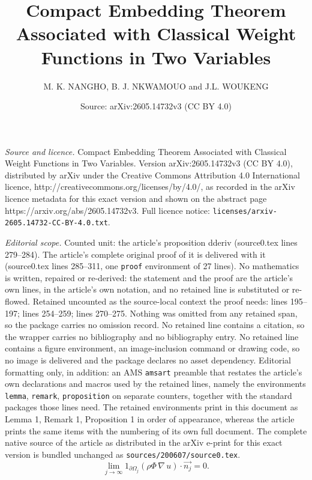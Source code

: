 \documentclass[10pt,a4paper]{amsart}
\title{Compact Embedding Theorem Associated with Classical Weight Functions in Two Variables}
\author{M. K. NANGHO, B. J. NKWAMOUO and J.L. WOUKENG}
\date{Source: arXiv:2605.14732v3 (CC BY 4.0)}
\begin{document}
\maketitle

\noindent\emph{Source and licence.} Compact Embedding Theorem Associated with Classical Weight Functions in Two Variables. Version arXiv:2605.14732v3 (CC BY 4.0), distributed by arXiv under the Creative Commons Attribution 4.0 International licence, http://creativecommons.org/licenses/by/4.0/, as recorded in the arXiv licence metadata for this exact version and shown on the abstract page https://arxiv.org/abs/2605.14732v3. Full licence notice: \texttt{licenses/arxiv-2605.14732-CC-BY-4.0.txt}.\par\smallskip

\noindent\textit{Editorial scope.} Counted unit: the article's proposition dderiv (source0.tex lines 279--284). The article's complete original proof of it is delivered with it (source0.tex lines 285--311, one \texttt{proof} environment of 27 lines). No mathematics is written, repaired or re-derived: the statement and the proof are the article's own lines, in the article's own notation, and no retained line is substituted or re-flowed.  Retained uncounted as the source-local context the proof needs: lines 195--197; lines 254--259; lines 270--275.  Nothing was omitted from any retained span, so the package carries no omission record.  No retained line contains a citation, so the wrapper carries no bibliography and no bibliography entry.  No retained line contains a figure environment, an image-inclusion command or drawing code, so no image is delivered and the package declares no asset dependency.  Editorial formatting only, in addition: an AMS \texttt{amsart} preamble that restates the article's own declarations and macros used by the retained lines, namely the environments \texttt{lemma}, \texttt{remark}, \texttt{proposition} on separate counters, together with the standard packages those lines need.  The retained environments print in this document as Lemma 1, Remark 1, Proposition 1 in order of appearance, whereas the article prints the same items with the numbering of its own full document.  The complete native source of the article as distributed in the arXiv e-print for this exact version is bundled unchanged as \texttt{sources/200607/source0.tex}.
			\begin{equation}\label{bc}
				\lim\limits_{j\rightarrow\infty}1_{\partial\Omega_j}\left(\rho \Phi\,\nabla\,u\right)\cdot\overrightarrow{n_j}=0.
			\end{equation}
\end{document}
